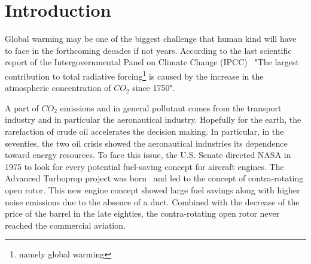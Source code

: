 
\chapter{Introduction}

Global warming may be one of the biggest challenge that human kind
will have to face in the forthcoming decades if not years.
According to the last scientific
report of the Intergovernmental Panel on Climate Change 
(IPCC)~\cite{IPCC2013}
"The largest contribution to total radiative 
forcing\footnote{namely global warming} 
is caused by the increase in the atmospheric 
concentration of $CO_2$ since 1750".

A part of $CO_2$ emissions and in general pollutant comes from the
transport industry and in particular the
aeronautical industry. 
Hopefully for the earth,
the rarefaction of crude oil accelerates the decision making.
In particular, in the seventies, the two oil crisis showed the aeronautical 
industries its dependence toward energy resources. 
To face this issue, the U.S. Senate directed NASA in 1975
to look for every potential fuel-saving concept for aircraft
engines. The Advanced Turboprop
project was born~\cite{Hager1988} and led to the
concept of contra-rotating open rotor. This new
engine concept showed large fuel savings
along with higher noise emissions due to the absence of
a duct. Combined with the decrease of the price of the
barrel in the late eighties, the contra-rotating open rotor 
never reached the commercial aviation.

